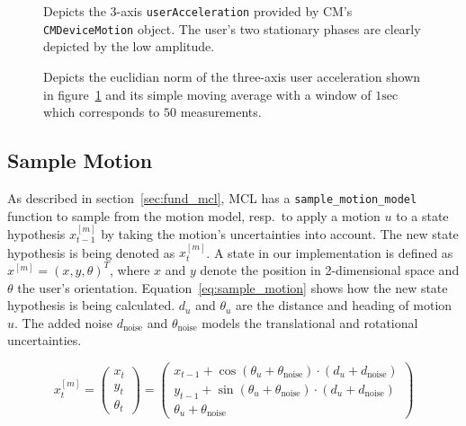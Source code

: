 \begin{figure}
	
	\caption{Depicts the 3-axis \texttt{userAcceleration} provided by \acs{CM}'s \texttt{CMDeviceMotion} object. The user's two stationary phases are clearly depicted by the low amplitude.}
	\label{fig:mm_stationary_1}
\end{figure}

\begin{figure}
	
	\caption{Depicts the euclidian norm of the three-axis user acceleration shown in figure~\ref{fig:mm_stationary_1} and its simple moving average with a window of $1 \text{sec}$ which corresponds to $50$ measurements.}
	\label{fig:mm_stationary_2}
\end{figure}



\subsection{Sample Motion}\label{sec:algo_sample_motion}
As described in section~\ref{sec:fund_mcl}, \acs{MCL} has a \texttt{sample\_motion\_model} function to sample from the motion model, resp.\ to apply a motion $u$ to a state hypothesis $x^{[m]}_{t-1}$ by taking the motion's uncertainties into account. The new state hypothesis is being denoted as $x^{[m]}_t$. A state in our implementation is defined as $x^{[m]} = (x, y, \theta)^T$, where $x$ and $y$ denote the position in 2-dimensional space and $\theta$ the user's orientation. Equation~\ref{eq:sample_motion} shows how the new state hypothesis is being calculated. $d_u$ and $\theta_u$ are the distance and heading of motion $u$. The added noise $d_\text{noise}$ and $\theta_\text{noise}$ models the translational and rotational uncertainties.

\begin{equation}\label{eq:sample_motion}
	x^{[m]}_t = \left(
    \begin{array}{c}
      x_t\\
      y_t\\
      \theta_t
    \end{array}
  \right) = \left(\begin{array}{c} x_{t-1} + \cos(\theta_u + \theta_{\text{noise}})\cdot (d_u + d_\text{noise}) \\ y_{t-1} + \sin(\theta_u + \theta_{\text{noise}})\cdot (d_u + d_\text{noise}) \\ \theta_u + \theta_{\text{noise}}
    \end{array}
  \right)
\end{equation}

